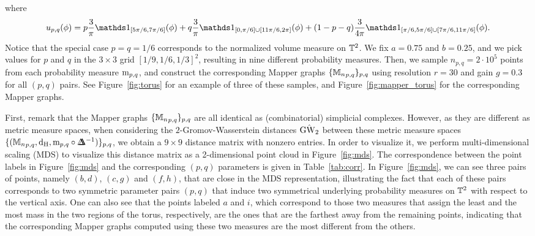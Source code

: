 where
$$u_{p,q}(\phi)=p\frac{3}{\pi}\ind_{[5\pi/6,7\pi/6]}(\phi)+q\frac{3}{\pi}\ind_{[0,\pi/6]\cup[11\pi/6,2\pi]}(\phi)+(1-p-q)\frac{3}{4\pi}\ind_{[\pi/6,5\pi/6]\cup[7\pi/6,11\pi/6]}(\phi).$$
Notice that the special case $p=q=1/6$ corresponds to the normalized volume measure on $\mathbb{T}^2$.
%
We fix $a=0.75$ and $b=0.25$, and we pick values for $p$ and $q$ in the $3\times 3$ grid $[1/9,1/6,1/3]^2$, resulting in nine different probability measures. Then, we sample $n_{p,q}=2\cdot10^5$ points from each probability measure $\mathrm{m}_{p,q}$, and construct the corresponding Mapper graphs $\{{\mathbb{M}_n}_{p,q}\}_{p,q}$ using resolution $r=30$ and gain $g=0.3$ for all $(p,q)$ pairs. See Figure~\ref{fig:torus} for an example of three of these samples, and Figure~\ref{fig:mapper_torus} for the corresponding Mapper graphs. %

First, remark that the Mapper graphs $\{{\mathbb{M}_n}_{p,q}\}_{p,q}$ are all identical as (combinatorial) simplicial complexes. %
However, as they are different as metric measure spaces, when considering the $2$-Gromov-Wasserstein distances $\Hat{\mathrm{GW}_2}$ between these metric measure spaces $\{({\mathbb{M}_n}_{p,q},{\mathrm {d_H}},\mathrm{m}_{p,q}\circ\Delta\!\!\!\!\Delta^{-1})\}_{p,q}$, we  obtain a $9\times 9$ distance matrix %
with nonzero entries.
In order to visualize it,
we perform multi-dimensional scaling (MDS) to visualize this distance matrix as a 2-dimensional point cloud in Figure~\ref{fig:mds}. The correspondence between the point labels in Figure~\ref{fig:mds} and the corresponding $(p,q)$ parameters  
is given in Table~\ref{tab:corr}. In Figure~\ref{fig:mds}, we can see three pairs of points, namely $(b,d)$, $(c,g)$ and $(f,h)$, that are close in the MDS representation, illustrating the fact that %
each of these pairs corresponds to two symmetric parameter pairs $(p,q)$
that induce two symmetrical underlying probability measures on $\mathbb{T}^2$ with respect to the vertical axis. One can also see that the points labeled $a$ and $i$, which correspond to those two measures that assign the least and the most mass in the two regions of the torus, respectively, are the ones that are the farthest away from the remaining points, indicating that the corresponding Mapper graphs computed using these two measures are the most different from the others. 

